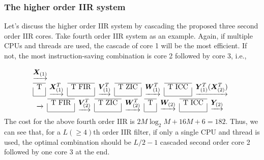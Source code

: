 \subsubsection{The higher order IIR system}

Let's discuss the higher order IIR system by cascading the proposed three second order IIR cores.
Take fourth order IIR system as an example.
Again, if multiple CPUs and threads are used, the cascade of core 1 will be the most efficient. 
If not, the most instruction-saving combination is core 2 followed by core 3, i.e.,

\begin{equation*}
    \label{eq:iir_system_4_core2_core3}
    \begin{aligned}
    & \underrightarrow{\bm{X}_{(1)}} \\
    & \begin{array}{|c|c|c|c|c|c|c|c}
        \cline{1-1}
        \cline{3-3}
        \cline{5-5}
        \cline{7-7}
        \text{T} & \underrightarrow{\bm{X}_{(1)}^T} & \text{T FIR} & \underrightarrow{\bm{V}_{(1)}^T} & \text{T ZIC} & \underrightarrow{\bm{W}_{(1)}^T} & \text{T ICC} & \underrightarrow{\bm{Y}_{(1)}^T(\bm{X}_{(2)}^T)} \\
        \cline{1-1}
        \cline{3-3}
        \cline{5-5}
        \cline{7-7}
    \end{array} \\
        & \begin{array}{c|c|c|c|c|c|c|c|c}
            \cline{2-2}
            \cline{4-4}
            \cline{6-6}
            \cline{8-8}
            \underrightarrow{} & \text{T FIR} & \underrightarrow{\bm{V}_{(2)}^T} & \text{T ZIC} & \underrightarrow{\bm{W}_{(2)}^T} & \text{T} & \underrightarrow{\bm{W}_{(2)}} & \text{T ICC}  & \underrightarrow{\bm{Y}_{(2)}} \\
            \cline{2-2}
            \cline{4-4}
            \cline{6-6}
            \cline{8-8}
    \end{array}
\end{aligned}
\end{equation*}
The cost for the above fourth order IIR is $2M{\log_2}M{+}16M{+}6 = 182$. Thus, we can see that, for a $L(\geq 4)$th order IIR filter, if only a single CPU and thread is used,
the optimal combination should be $L/2{-}1$ cascaded second order core 2 followed by one core 3 at the end.

